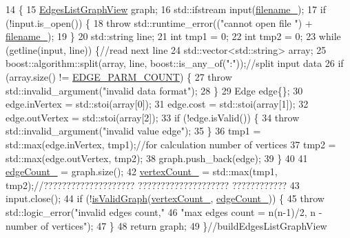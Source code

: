 \begin{DoxyCode}
14                                                                  \{
15             \hyperlink{a00037_aa7134896d837083f384364b56a32bb49_aa7134896d837083f384364b56a32bb49}{EdgesListGraphView} graph;
16             std::ifstream input(\hyperlink{a00007_a49e700993aec96bffaa4728eca205731_a49e700993aec96bffaa4728eca205731}{filename\_});
17             \textcolor{keywordflow}{if} (!input.is\_open()) \{
18                 \textcolor{keywordflow}{throw} std::runtime\_error((\textcolor{stringliteral}{"cannot open file "}) + \hyperlink{a00007_a49e700993aec96bffaa4728eca205731_a49e700993aec96bffaa4728eca205731}{filename\_});
19             \}
20             std::string line;
21             \textcolor{keywordtype}{int} tmp1 = 0;
22             \textcolor{keywordtype}{int} tmp2 = 0;
23             \textcolor{keywordflow}{while} (getline(input, line)) \{\textcolor{comment}{//read next line}
24                 std::vector<std::string> array;
25                 boost::algorithm::split(array, line, boost::is\_any\_of(\textcolor{stringliteral}{":"}));\textcolor{comment}{//split input data}
26                 \textcolor{keywordflow}{if} (array.size() != \hyperlink{a00007_ac15969ca7cebe4751ebfc0b4c5f4e060_ac15969ca7cebe4751ebfc0b4c5f4e060}{EDGE\_PARM\_COUNT}) \{
27                     \textcolor{keywordflow}{throw} std::invalid\_argument(\textcolor{stringliteral}{"invalid data format"});
28                 \}
29                 Edge edge\{\};
30                 edge.inVertex = std::stoi(array[0]);
31                 edge.cost = std::stoi(array[1]);
32                 edge.outVertex = std::stoi(array[2]);
33                 \textcolor{keywordflow}{if} (!edge.isValid()) \{
34                     \textcolor{keywordflow}{throw} std::invalid\_argument(\textcolor{stringliteral}{"invalid value edge"});
35                 \}
36                 tmp1 = std::max(edge.inVertex, tmp1);\textcolor{comment}{//for calculation number of vertices}
37                 tmp2 = std::max(edge.outVertex, tmp2);
38                 graph.push\_back(edge);
39             \}
40 
41             \hyperlink{a00007_a8e9f0fc598b4370e04a32b926c9baf81_a8e9f0fc598b4370e04a32b926c9baf81}{edgeCount\_} = graph.size();
42             \hyperlink{a00007_ae1613c30ca3542a05340fb9b355ed994_ae1613c30ca3542a05340fb9b355ed994}{vertexCount\_} = std::max(tmp1, tmp2);\textcolor{comment}{//???????????????????? ???????????????????? ????????????}
43             input.close();
44             \textcolor{keywordflow}{if} (!\hyperlink{a00007_ad40e02849e59b544cf33fe279f325e5f_ad40e02849e59b544cf33fe279f325e5f}{isValidGraph}(\hyperlink{a00007_ae1613c30ca3542a05340fb9b355ed994_ae1613c30ca3542a05340fb9b355ed994}{vertexCount\_}, \hyperlink{a00007_a8e9f0fc598b4370e04a32b926c9baf81_a8e9f0fc598b4370e04a32b926c9baf81}{edgeCount\_})) \{
45                 \textcolor{keywordflow}{throw} std::logic\_error(\textcolor{stringliteral}{"invalid edges count,"}
46                                                \textcolor{stringliteral}{"max edges count = n(n-1)/2, n - number of vertices"});
47             \}
48             \textcolor{keywordflow}{return} graph;
49         \}\textcolor{comment}{//buildEdgesListGraphView}
\end{DoxyCode}
